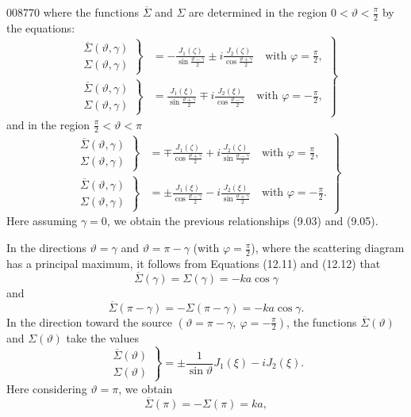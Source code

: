 \begin{scanpage}{0087}{70}
where the functions $\overline\Sigma$ and $\Sigma$ are determined in the region $0<\vartheta<\frac\pi2$ by the equations:
\[
\left.\begin{aligned}
\left.\begin{matrix}\overline\Sigma(\vartheta,\gamma)\\\Sigma(\vartheta,\gamma)\end{matrix}\right\}
&=-\frac{J_1(\zeta)}{\sin\frac{\vartheta-\gamma}2}\pm i\frac{J_2(\zeta)}{\cos\frac{\vartheta+\gamma}2}\quad\text{with }\varphi=\frac\pi2,\\
\left.\begin{matrix}\overline\Sigma(\vartheta,\gamma)\\\Sigma(\vartheta,\gamma)\end{matrix}\right\}
&=\frac{J_1(\xi)}{\sin\frac{\vartheta+\gamma}2}\mp i\frac{J_2(\xi)}{\cos\frac{\vartheta-\gamma}2}\quad\text{with }\varphi=-\frac\pi2,
\end{aligned}\right\}\tag{12.11}
\]
and in the region $\frac\pi2<\vartheta<\pi$
\[
\left.\begin{aligned}
\left.\begin{matrix}\overline\Sigma(\vartheta,\gamma)\\\Sigma(\vartheta,\gamma)\end{matrix}\right\}
&=\mp\frac{J_1(\zeta)}{\cos\frac{\vartheta+\gamma}2}+i\frac{J_2(\zeta)}{\sin\frac{\vartheta-\gamma}2}\quad\text{with }\varphi=\frac\pi2,\\
\left.\begin{matrix}\overline\Sigma(\vartheta,\gamma)\\\Sigma(\vartheta,\gamma)\end{matrix}\right\}
&=\pm\frac{J_1(\xi)}{\cos\frac{\vartheta-\gamma}2}-i\frac{J_2(\xi)}{\sin\frac{\vartheta+\gamma}2}\quad\text{with }\varphi=-\frac\pi2.
\end{aligned}\right\}\tag{12.12}
\]
Here assuming $\gamma=0$, we obtain the previous relationships (9.03) and (9.05).

In the directions $\vartheta=\gamma$ and $\vartheta=\pi-\gamma$ (with $\varphi=\frac\pi2$), where the scattering diagram has a principal maximum, it follows from Equations (12.11) and (12.12) that
\[\overline\Sigma(\gamma)=\Sigma(\gamma)=-ka\cos\gamma\tag{12.13}\]
and
\[\overline\Sigma(\pi-\gamma)=-\Sigma(\pi-\gamma)=-ka\cos\gamma.\tag{12.14}\]
In the direction toward the source $(\vartheta=\pi-\gamma,\ \varphi=-\frac\pi2)$, the functions $\overline\Sigma(\vartheta)$ and $\Sigma(\vartheta)$ take the values
\[\left.\begin{matrix}\overline\Sigma(\vartheta)\\\Sigma(\vartheta)\end{matrix}\right\}=\pm\frac1{\sin\vartheta}J_1(\xi)-iJ_2(\xi).\tag{12.15}\]
Here considering $\vartheta=\pi$, we obtain
\[\overline\Sigma(\pi)=-\Sigma(\pi)=ka,\tag{12.16}\]
\end{scanpage}
